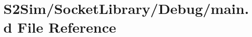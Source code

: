 \hypertarget{_socket_library_2_debug_2main_8d}{\section{S2\-Sim/\-Socket\-Library/\-Debug/main.d File Reference}
\label{_socket_library_2_debug_2main_8d}
}
